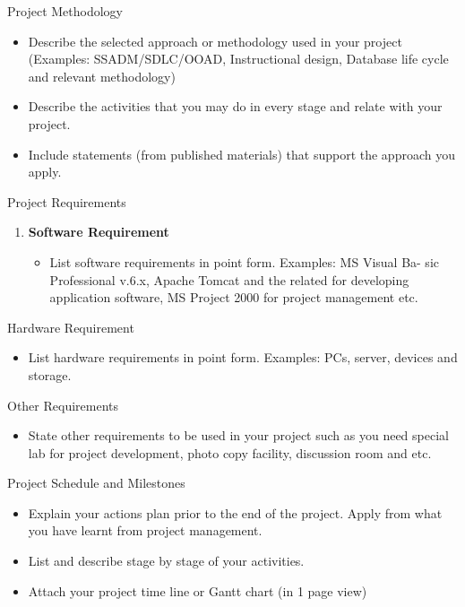 Project Methodology

\begin{itemize}
\item
  Describe the selected approach or methodology used in your project
  (Examples: SSADM/SDLC/OOAD, Instructional design, Database life cycle
  and relevant methodology)
\item
  Describe the activities that you may do in every stage and relate with
  your project.
\item
  Include statements (from published materials) that support the
  approach you apply.
\end{itemize}

Project Requirements

\begin{enumerate}
\def\labelenumi{\arabic{enumi}.}
\item
  \textbf{Software Requirement}

  \begin{itemize}
  \item
    List software requirements in point form. Examples: MS Visual Ba-
    sic Professional v.6.x, Apache Tomcat and the related for developing
    application software, MS Project 2000 for project management etc.
  \end{itemize}
\end{enumerate}

Hardware Requirement

\begin{itemize}
\item
  List hardware requirements in point form. Examples: PCs, server,
  devices and storage.
\end{itemize}

Other Requirements

\begin{itemize}
\item
  State other requirements to be used in your project such as you need
  special lab for project development, photo copy facility, discussion
  room and etc.
\end{itemize}

Project Schedule and Milestones

\begin{itemize}
\item
  Explain your actions plan prior to the end of the project. Apply from
  what you have learnt from project management.
\item
  List and describe stage by stage of your activities.
\item
  Attach your project time line or Gantt chart (in 1 page view)
\end{itemize}

